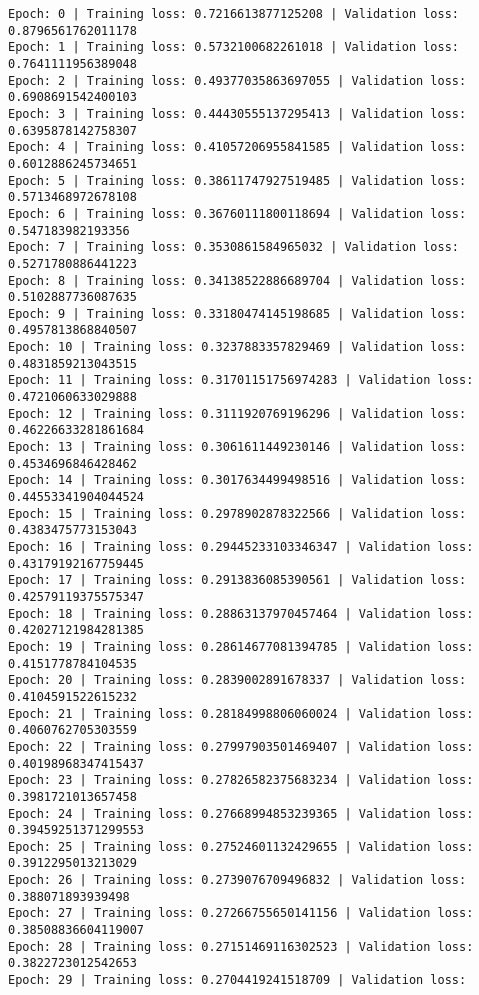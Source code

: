 \documentclass[11pt]{article}
\begin{document}
    \begin{Verbatim}[commandchars=\\\{\}]
Epoch: 0 | Training loss: 0.7216613877125208 | Validation loss:
0.8796561762011178
Epoch: 1 | Training loss: 0.5732100682261018 | Validation loss:
0.7641111956389048
Epoch: 2 | Training loss: 0.49377035863697055 | Validation loss:
0.6908691542400103
Epoch: 3 | Training loss: 0.44430555137295413 | Validation loss:
0.6395878142758307
Epoch: 4 | Training loss: 0.41057206955841585 | Validation loss:
0.6012886245734651
Epoch: 5 | Training loss: 0.38611747927519485 | Validation loss:
0.5713468972678108
Epoch: 6 | Training loss: 0.36760111800118694 | Validation loss:
0.547183982193356
Epoch: 7 | Training loss: 0.3530861584965032 | Validation loss:
0.5271780886441223
Epoch: 8 | Training loss: 0.34138522886689704 | Validation loss:
0.5102887736087635
Epoch: 9 | Training loss: 0.33180474145198685 | Validation loss:
0.4957813868840507
Epoch: 10 | Training loss: 0.3237883357829469 | Validation loss:
0.4831859213043515
Epoch: 11 | Training loss: 0.31701151756974283 | Validation loss:
0.4721060633029888
Epoch: 12 | Training loss: 0.3111920769196296 | Validation loss:
0.46226633281861684
Epoch: 13 | Training loss: 0.3061611449230146 | Validation loss:
0.4534696846428462
Epoch: 14 | Training loss: 0.3017634499498516 | Validation loss:
0.44553341904044524
Epoch: 15 | Training loss: 0.2978902878322566 | Validation loss:
0.4383475773153043
Epoch: 16 | Training loss: 0.29445233103346347 | Validation loss:
0.43179192167759445
Epoch: 17 | Training loss: 0.2913836085390561 | Validation loss:
0.42579119375575347
Epoch: 18 | Training loss: 0.28863137970457464 | Validation loss:
0.42027121984281385
Epoch: 19 | Training loss: 0.28614677081394785 | Validation loss:
0.4151778784104535
Epoch: 20 | Training loss: 0.2839002891678337 | Validation loss:
0.4104591522615232
Epoch: 21 | Training loss: 0.28184998806060024 | Validation loss:
0.4060762705303559
Epoch: 22 | Training loss: 0.27997903501469407 | Validation loss:
0.40198968347415437
Epoch: 23 | Training loss: 0.27826582375683234 | Validation loss:
0.3981721013657458
Epoch: 24 | Training loss: 0.27668994853239365 | Validation loss:
0.39459251371299553
Epoch: 25 | Training loss: 0.27524601132429655 | Validation loss:
0.3912295013213029
Epoch: 26 | Training loss: 0.2739076709496832 | Validation loss:
0.388071893939498
Epoch: 27 | Training loss: 0.27266755650141156 | Validation loss:
0.38508836604119007
Epoch: 28 | Training loss: 0.27151469116302523 | Validation loss:
0.3822723012542653
Epoch: 29 | Training loss: 0.2704419241518709 | Validation loss:

\end{Verbatim}
\end{document}
